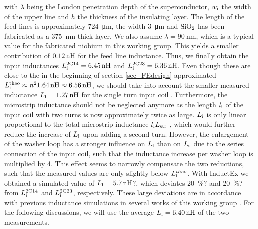 with $\lambda$ being the London penetration depth of the superconductor, $w_{\rm i}$ the width of the upper line and $h$ the thickness of the insulating layer. The length of the feed lines is approximately \qty{724}{\um}, the width \qty{3}{\um} and $\rm{SiO_2}$ has been fabricated as a \qty{375}{\nm} thick layer. We also assume $\lambda=\qty{90}{\nm}$, which is a typical value for the fabricated niobium in this working group. This yields a smaller contribution of $\qty{0.12}{\nH}$ for the feed line inductance. Thus, we finally obtain the input inductances $L_{\rm i}^{\rm 2C14}=\qty{6.45}{\nH}$ and $L_{\rm i}^{\rm 2C23}=\qty{6.36}{\nH}$. Even though these are close to the in the beginning of section \ref{sec_FEdesign} approximated $L_{\rm i}^{\rm theo}\approx n^{2}\qty{1.64}{\nH}\approx\qty{6.56}{\nH}$, we should take into account the smaller measured inductance $L_{\rm i}=\qty{1.27}{\nH}$ for the single turn input coil \cite{Bauer2022}. Furthermore, the microstrip inductance should not be neglected anymore as the length $l_{\rm i}$ of the input coil with two turns is now approximately twice as large. $L_{\rm i}$ is only linear proportional to the total microstrip inductance $l_{\rm i}L_{\rm str}$ \cite{Ketchen1991}, which would further reduce the increase of $L_{\rm i}$ upon adding a second turn. However, the enlargement of the washer loop has a stronger influence on $L_{\rm i}$ than on $L_{\rm s}$ due to the series connection of the input coil, such that the inductance increase per washer loop is multiplied by 4. This effect seems to narrowly compensate the two reductions, such that the measured values are only slightly below $L_{\rm i}^{theo}$. With InductEx we obtained a simulated value of $L_{\rm i}=\qty{5.7}{\nH}$?, which deviates \qty{20}{\percent}? and \qty{20}{\percent}? from $L_{\rm i}^{\rm 2C14}$ and $L_{\rm i}^{\rm 2C23}$, respectively. These large deviations are in accordance with previous inductance simulations in several works of this working group \cite{Ferring2015, Bauer2022}. For the following discussions, we will use the average $L_{\rm i}=\qty{6.40}{\nH}$ of the two measurements. \\

